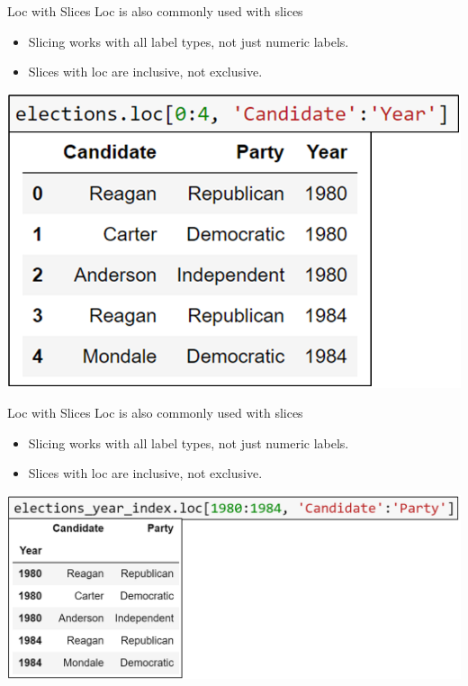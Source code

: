 \documentclass[aspectratio=169]{../latex_main/tntbeamer}  %
\begin{document}
	
	\begin{frame}{Loc with Slices}
	    Loc is also commonly used with slices
	    \begin{itemize}
	        \item Slicing works with all label types, not just numeric labels.
	        \item Slices with loc are inclusive, not exclusive.
	    \end{itemize}
	    \includegraphics[scale=.4]{Bild26}
	\end{frame}
	
	
	\begin{frame}{Loc with Slices}
	    Loc is also commonly used with slices
	    \begin{itemize}
	        \item Slicing works with all label types, not just numeric labels.
	        \item Slices with loc are inclusive, not exclusive.
	    \end{itemize}
	    \includegraphics[scale=.39]{Bild27}
	\end{frame}
	
\end{document}
